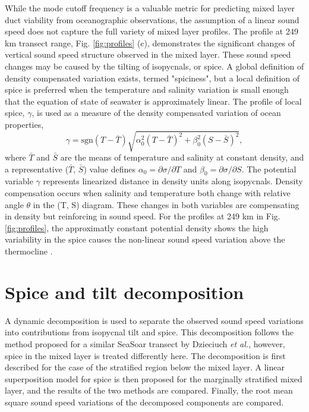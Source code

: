 \documentclass[preprint,NumberedRefs]{JASA}
\begin{document}
While the mode cutoff frequency is a valuable metric for predicting mixed layer duct viability from oceanographic observations, the assumption of a linear sound speed does not capture the full variety of mixed layer profiles. The profile at 249 km transect range, Fig. \ref{fig:profiles} (c), demonstrates the significant changes of vertical sound speed structure observed in the mixed layer. These sound speed changes may be caused by the tilting of isopycnals, or spice. A global definition of density compensated variation exists, termed "spiciness"\citep{mcdougall2015spiciness}, but a local definition of spice is preferred when the temperature and salinity variation is small enough that the equation of state of seawater is approximately linear\citep{ferrari2000}. The profile of local spice, $\gamma$, is used as a measure of the density compensated variation \citep{klymak2015spice} of ocean properties,
\begin{equation}
    \gamma=\textrm{sgn}(T-\bar{T}) \sqrt{\alpha_0^2(T-\bar{T})^2 +\beta_0^2(S-\bar{S})^2},
    \label{eq:gamma}
\end{equation}
where $\bar{T}$ and $\bar{S}$ are the means of temperature and salinity at constant density, and a representative ($\bar{T}$, $\bar{S}$) value defines $\alpha_0=\partial \sigma / \partial T$ and $\beta_0=\partial \sigma / \partial S$. The potential variable $\gamma$ represents linearized distance in density units along isopycnals. Density compensation occurs when salinity and temperature both change with relative angle $\theta$ in the (T, S) diagram. These changes in both variables are compensating in density but reinforcing in sound speed. For the profiles at 249 km in Fig. \ref{fig:profiles}, the approximatly constant potential density shows the high variability in the spice causes the non-linear sound speed variation above the thermocline .


\section{\label{sec:decomposition}Spice and tilt decomposition}
A dynamic decomposition is used to separate the observed sound speed variations into contributions from isopycnal tilt and spice. This decomposition follows the method proposed for a similar SeaSoar transect by Dzieciuch \emph{et al.}\citep{dzieciuch2004}, however, spice in the mixed layer is treated differently here. The decomposition is first described for the case of the stratified region below the mixed layer. A linear superposition model for spice is then proposed for the marginally stratified mixed layer, and the results of the two methods are compared. Finally, the root mean square sound speed variations of the decomposed components are compared.
\end{document}
